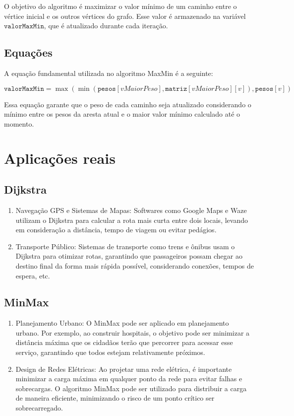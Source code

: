 \documentclass[12pt]{article}
\begin{document}
O objetivo do algoritmo é maximizar o valor mínimo de um caminho entre o vértice inicial e os outros vértices do grafo. Esse valor é armazenado na variável \( \texttt{valorMaxMin} \), que é atualizado durante cada iteração.

\subsection{Equações}

A equação fundamental utilizada no algoritmo MaxMin é a seguinte:

\[
\texttt{valorMaxMin} = \max \left( \min(\texttt{pesos}[vMaiorPeso], \texttt{matriz}[vMaiorPeso][v]), \texttt{pesos}[v] \right)
\]

\noindent Essa equação garante que o peso de cada caminho seja atualizado considerando o mínimo entre os pesos da aresta atual e o maior valor mínimo calculado até o momento.

\section{Aplicações reais}
\subsection{Dijkstra}
\begin{enumerate}
    \item Navegação GPS e Sistemas de Mapas: Softwares como Google Maps e Waze utilizam o Dijkstra para calcular a rota mais curta entre dois locais, levando em consideração a distância, tempo de viagem ou evitar pedágios.
    \item Transporte Público: Sistemas de transporte como trens e ônibus usam o Dijkstra para otimizar rotas, garantindo que passageiros possam chegar ao destino final da forma mais rápida possível, considerando conexões, tempos de espera, etc.
\end{enumerate}

\subsection{MinMax}
\begin{enumerate}
    \item Planejamento Urbano: O MinMax pode ser aplicado em planejamento urbano. Por exemplo, ao construir hospitais, o objetivo pode ser minimizar a distância máxima que os cidadãos terão que percorrer para acessar esse serviço, garantindo que todos estejam relativamente próximos.
    \item Design de Redes Elétricas: Ao projetar uma rede elétrica, é importante minimizar a carga máxima em qualquer ponto da rede para evitar falhas e sobrecargas. O algoritmo MinMax pode ser utilizado para distribuir a carga de maneira eficiente, minimizando o risco de um ponto crítico ser sobrecarregado.
\end{enumerate}
\end{document}
